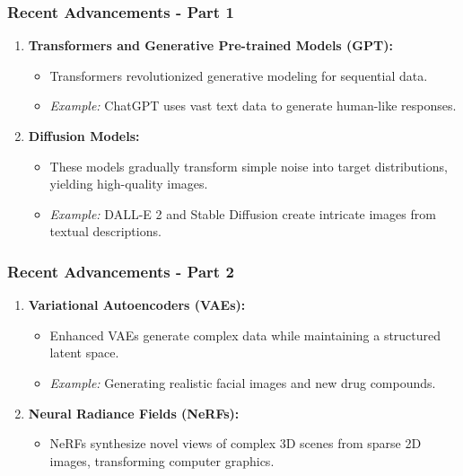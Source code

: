 \documentclass[aspectratio=169]{beamer}
\begin{document}
\begin{frame}[fragile]
    \frametitle{Recent Advancements - Part 1}
    
    \begin{enumerate}
        \item \textbf{Transformers and Generative Pre-trained Models (GPT):}
            \begin{itemize}
                \item Transformers revolutionized generative modeling for sequential data.
                \item \textit{Example:} ChatGPT uses vast text data to generate human-like responses.
            \end{itemize}
        
        \item \textbf{Diffusion Models:}
            \begin{itemize}
                \item These models gradually transform simple noise into target distributions, yielding high-quality images.
                \item \textit{Example:} DALL-E 2 and Stable Diffusion create intricate images from textual descriptions.
            \end{itemize}
    \end{enumerate}
\end{frame}

\begin{frame}[fragile]
    \frametitle{Recent Advancements - Part 2}

    \begin{enumerate}[resume]
        \item \textbf{Variational Autoencoders (VAEs):}
            \begin{itemize}
                \item Enhanced VAEs generate complex data while maintaining a structured latent space.
                \item \textit{Example:} Generating realistic facial images and new drug compounds.
            \end{itemize}
        
        \item \textbf{Neural Radiance Fields (NeRFs):}
            \begin{itemize}
                \item NeRFs synthesize novel views of complex 3D scenes from sparse 2D images, transforming computer graphics.
            \end{itemize}
    \end{enumerate}
\end{frame}
\end{document}
